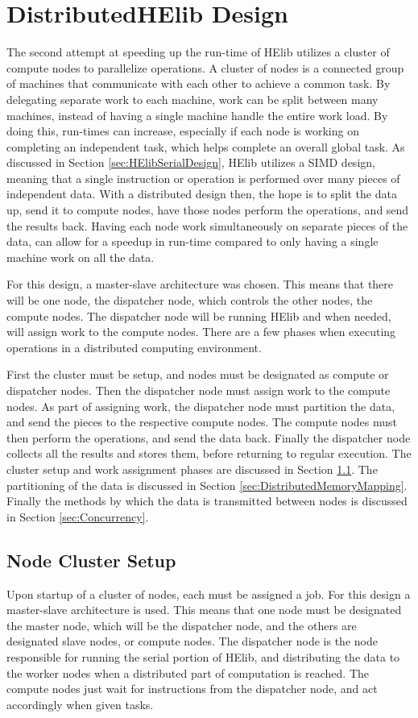 \chapter{DistributedHElib Design} \label{chap:DistributedHElibDesign}
The second attempt at speeding up the run-time of HElib utilizes a cluster of compute nodes to parallelize operations. A cluster of nodes is a connected group of machines that communicate with each other to achieve a common task. By delegating separate work to each machine, work can be split between many machines, instead of having a single machine handle the entire work load. By doing this, run-times can increase, especially if each node is working on completing an independent task, which helps complete an overall global task. As discussed in Section \ref{sec:HElibSerialDesign}, HElib utilizes a SIMD design, meaning that a single instruction or operation is performed over many pieces of independent data. With a distributed design then, the hope is to split the data up, send it to compute nodes, have those nodes perform the operations, and send the results back. Having each node work simultaneously on separate pieces of the data, can allow for a speedup in run-time compared to only having a single machine work on all the data.

For this design, a master-slave architecture was chosen. This means that there will be one node, the dispatcher node, which controls the other nodes, the compute nodes. The dispatcher node will be running HElib and when needed, will assign work to the compute nodes. There are a few phases when executing operations in a distributed computing environment.

First the cluster must be setup, and nodes must be designated as compute or dispatcher nodes. Then the dispatcher node must assign work to the compute nodes. As part of assigning work, the dispatcher node must partition the data, and send the pieces to the respective compute nodes. The compute nodes must then perform the operations, and send the data back. Finally the dispatcher node collects all the results and stores them, before returning to regular execution. The cluster setup and work assignment phases are discussed in Section \ref{sec:NodeClusterSetup}. The partitioning of the data is discussed in Section \ref{sec:DistributedMemoryMapping}. Finally the methods by which the data is transmitted between nodes is discussed in Section \ref{sec:Concurrency}.
 
\section{Node Cluster Setup} \label{sec:NodeClusterSetup}
Upon startup of a cluster of nodes, each must be assigned a job. For this design a master-slave architecture is used. This means that one node must be designated the master node, which will be the dispatcher node, and the others are designated slave nodes, or compute nodes. The dispatcher node is the node responsible for running the serial portion of HElib, and distributing the data to the worker nodes when a distributed part of computation is reached. The compute nodes just wait for instructions from the dispatcher node, and act accordingly when given tasks.

